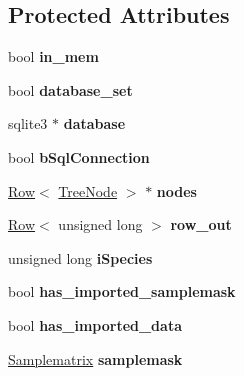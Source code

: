 \subsection*{Protected Attributes}
\begin{DoxyCompactItemize}
\item 
bool {\bfseries in\+\_\+mem}\hypertarget{class_community_abc144eeba19574b6b46df384a61acc6f}{}\label{class_community_abc144eeba19574b6b46df384a61acc6f}

\item 
bool {\bfseries database\+\_\+set}\hypertarget{class_community_a7e00bcb1c5a24280346df94853e2919b}{}\label{class_community_a7e00bcb1c5a24280346df94853e2919b}

\item 
sqlite3 $\ast$ {\bfseries database}\hypertarget{class_community_a382c0e6e90ca8055d3192bfe2af4d741}{}\label{class_community_a382c0e6e90ca8055d3192bfe2af4d741}

\item 
bool {\bfseries b\+Sql\+Connection}\hypertarget{class_community_aa9fe335ff9e94c626d1e0d41ff145524}{}\label{class_community_aa9fe335ff9e94c626d1e0d41ff145524}

\item 
\hyperlink{class_row}{Row}$<$ \hyperlink{class_tree_node}{Tree\+Node} $>$ $\ast$ {\bfseries nodes}\hypertarget{class_community_aa1309616989642b98c15e6e2ed25b379}{}\label{class_community_aa1309616989642b98c15e6e2ed25b379}

\item 
\hyperlink{class_row}{Row}$<$ unsigned long $>$ {\bfseries row\+\_\+out}\hypertarget{class_community_a06e5a133792f29fa17a1b0664d650541}{}\label{class_community_a06e5a133792f29fa17a1b0664d650541}

\item 
unsigned long {\bfseries i\+Species}\hypertarget{class_community_a094f10ce5bbbcab19bccda352f545aad}{}\label{class_community_a094f10ce5bbbcab19bccda352f545aad}

\item 
bool {\bfseries has\+\_\+imported\+\_\+samplemask}\hypertarget{class_community_a6c3c70184f586330635a4123699f586f}{}\label{class_community_a6c3c70184f586330635a4123699f586f}

\item 
bool {\bfseries has\+\_\+imported\+\_\+data}\hypertarget{class_community_a0371c39658281c8956c29c6b2d564b79}{}\label{class_community_a0371c39658281c8956c29c6b2d564b79}

\item 
\hyperlink{class_samplematrix}{Samplematrix} {\bfseries samplemask}\hypertarget{class_community_ac7434119a77086e3b38a4a94c8fbff01}{}\label{class_community_ac7434119a77086e3b38a4a94c8fbff01}


\end{DoxyCompactItemize}
